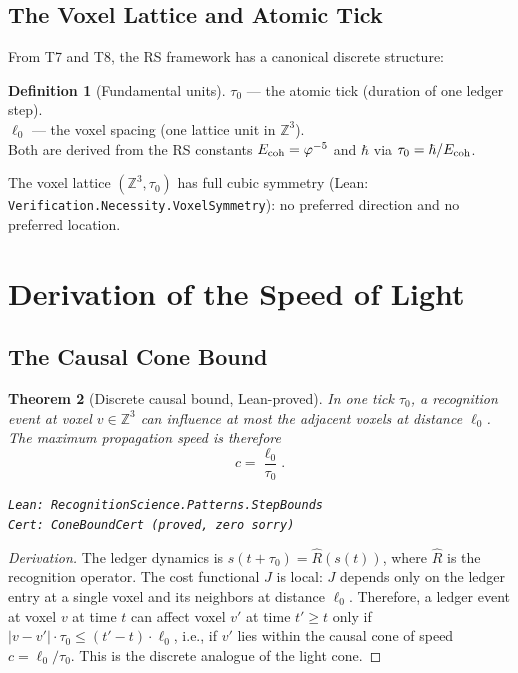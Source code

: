 \documentclass[12pt,a4paper]{article}
\newtheorem{theorem}{Theorem}[section]
\theoremstyle{definition}
\newtheorem{definition}[theorem]{Definition}
\theoremstyle{remark}
\begin{document}
\subsection{The Voxel Lattice and Atomic Tick}

From T7 and T8, the RS framework has a canonical discrete structure:
\begin{definition}[Fundamental units]
  $\tau_0$ --- the atomic tick (duration of one ledger step).\\
  $\ell_0$ --- the voxel spacing (one lattice unit in $\mathbb{Z}^3$).\\
  Both are derived from the RS constants $E_{\rm coh} = \varphi^{-5}$
  and $\hbar$ via $\tau_0 = \hbar/E_{\rm coh}$.
\end{definition}

The voxel lattice $(\mathbb{Z}^3, \tau_0)$ has full cubic symmetry
(Lean: \texttt{Verification.Necessity.VoxelSymmetry}): no preferred
direction and no preferred location.

\section{Derivation of the Speed of Light}
\label{sec:derivation}

\subsection{The Causal Cone Bound}

\begin{theorem}[Discrete causal bound, Lean-proved]\label{thm:bound}
In one tick $\tau_0$, a recognition event at voxel $v \in \mathbb{Z}^3$
can influence at most the adjacent voxels at distance $\ell_0$.
The maximum propagation speed is therefore
\begin{equation}
  c = \frac{\ell_0}{\tau_0}.
  \label{eq:c}
\end{equation}

\texttt{Lean: RecognitionScience.Patterns.StepBounds}\\
\texttt{Cert: ConeBoundCert (proved, zero sorry)}
\end{theorem}

\begin{proof}[Derivation]
The ledger dynamics is $s(t + \tau_0) = \hat{R}(s(t))$, where $\hat{R}$
is the recognition operator.  The cost functional $J$ is local: $J$
depends only on the ledger entry at a single voxel and its neighbors at
distance $\ell_0$.  Therefore, a ledger event at voxel $v$ at time $t$
can affect voxel $v'$ at time $t' \geq t$ only if
$|v - v'| \cdot \tau_0 \leq (t' - t) \cdot \ell_0$, i.e., if $v'$ lies
within the causal cone of speed $c = \ell_0/\tau_0$.  This is the
discrete analogue of the light cone.
\end{proof}
\end{document}
